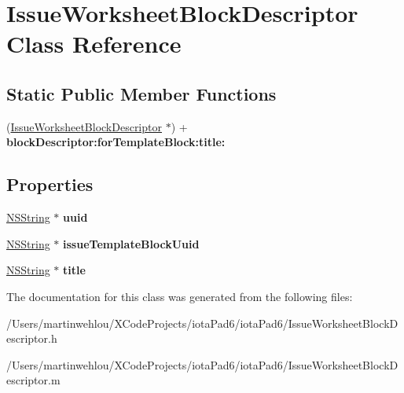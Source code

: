 \hypertarget{interface_issue_worksheet_block_descriptor}{
\section{IssueWorksheetBlockDescriptor Class Reference}
\label{interface_issue_worksheet_block_descriptor}
}
\subsection*{Static Public Member Functions}
\begin{DoxyCompactItemize}
\item 
\hypertarget{interface_issue_worksheet_block_descriptor_aee7fde13338c105fbc24836cccafd13b}{
(\hyperlink{interface_issue_worksheet_block_descriptor}{IssueWorksheetBlockDescriptor} $\ast$) + {\bfseries blockDescriptor:forTemplateBlock:title:}}
\label{interface_issue_worksheet_block_descriptor_aee7fde13338c105fbc24836cccafd13b}

\end{DoxyCompactItemize}
\subsection*{Properties}
\begin{DoxyCompactItemize}
\item 
\hypertarget{interface_issue_worksheet_block_descriptor_aaaadaa36cdff697c925259dbbfe73baf}{
\hyperlink{class_n_s_string}{NSString} $\ast$ {\bfseries uuid}}
\label{interface_issue_worksheet_block_descriptor_aaaadaa36cdff697c925259dbbfe73baf}

\item 
\hypertarget{interface_issue_worksheet_block_descriptor_a134a22a48c34a516e00f68861bff2697}{
\hyperlink{class_n_s_string}{NSString} $\ast$ {\bfseries issueTemplateBlockUuid}}
\label{interface_issue_worksheet_block_descriptor_a134a22a48c34a516e00f68861bff2697}

\item 
\hypertarget{interface_issue_worksheet_block_descriptor_ada6b492449ab4d81b250c1ec583fec0f}{
\hyperlink{class_n_s_string}{NSString} $\ast$ {\bfseries title}}
\label{interface_issue_worksheet_block_descriptor_ada6b492449ab4d81b250c1ec583fec0f}

\end{DoxyCompactItemize}


The documentation for this class was generated from the following files:\begin{DoxyCompactItemize}
\item 
/Users/martinwehlou/XCodeProjects/iotaPad6/iotaPad6/IssueWorksheetBlockDescriptor.h\item 
/Users/martinwehlou/XCodeProjects/iotaPad6/iotaPad6/IssueWorksheetBlockDescriptor.m\end{DoxyCompactItemize}
